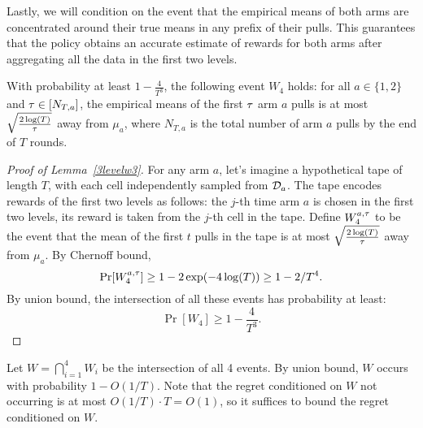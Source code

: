 Lastly, we will condition on the event that the empirical means of
both arms are concentrated around their true means in any prefix of
their pulls. This guarantees that the policy obtains an accurate
estimate of rewards for both arms after aggregating all the data in
the first two levels.



\begin{lemma}\label{3levelw3}
  With probability at least $1 - \frac{4}{T^3}$, the following event
  $W_4$ holds: for all $a\in \{1, 2\}$ and $\tau \in [N_{T, a}]$, the
  empirical means of the first $\tau$ 
  arm $a$ pulls is at most
  $\sqrt{\frac{2\log(T)}{\tau}}$ away from $\mu_a$, where $N_{T, a}$ is
  the total number of arm $a$ pulls by the end of $T$ rounds.
\end{lemma}


\begin{proof}[Proof of Lemma~\ref{3levelw3}]
  For any arm $a$, let's imagine a hypothetical tape of length $T$,
  with each cell independently sampled from $\mathcal{D}_a$. The tape encodes
  rewards of the first two levels as follows: the $j$-th time arm $a$
  is chosen in the first two levels, its reward is taken from the
  $j$-th cell in the tape. Define $W_4^{a,\tau}$ to be the event that the
  mean of the first $t$ pulls in the tape is at most
  $\sqrt{\frac{2\log(T)}{\tau}}$ away from $\mu_a$. By Chernoff bound,
\[
\Pr[W_4^{a,\tau}] \geq 1 - 2\exp(-4\log(T)) \geq 1- 2/T^4.
\]
By union bound, the intersection of all these events has probability
at least:
\[
\Pr[W_4] \geq 1- \frac{4}{T^3}.
\]
\end{proof}


Let $W = \bigcap_{i=1}^4 W_i$ be the intersection of all 4
events.  By union bound, $W$ occurs with probability $1-O(1/T)$. Note
that the regret conditioned on $W$ not occurring is at most
$O(1/T) \cdot T = O(1)$, so it suffices to bound the regret conditioned on $W$.








